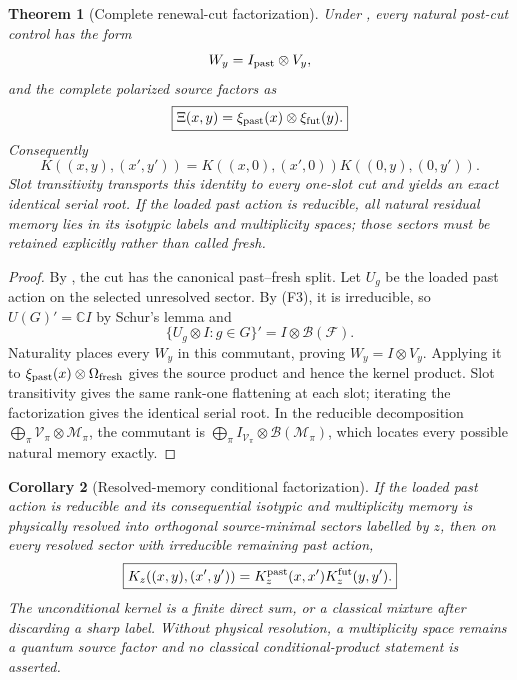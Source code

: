 \documentclass[11pt]{article}
\newtheorem{theorem}{Theorem}[section]
\newtheorem{corollary}[theorem]{Corollary}
\theoremstyle{definition}
\theoremstyle{remark}
\newcommand{\C}{\mathbb C}
\begin{document}
\begin{theorem}[Complete renewal-cut factorization]
\label{thm:complete-cut-factorization-master}
Under , every natural post-cut control has the
form
\[
 W_y=I_{\rm past}\otimes V_y,
\]
and the complete polarized source factors as
\[
 \boxed{\Xi(x,y)=\xi_{\rm past}(x)\otimes\xi_{\rm fut}(y).}
\]
Consequently
\[
 \boxed{
 K((x,y),(x',y'))
 =K((x,0),(x',0))K((0,y),(0,y')).}
\]
Slot transitivity transports this identity to every one-slot cut and yields an
exact identical serial root.  If the loaded past action is reducible, all
natural residual memory lies in its isotypic labels and multiplicity spaces;
those sectors must be retained explicitly rather than called fresh.
\end{theorem}

\begin{proof}
By ,
the cut has the canonical past--fresh split.  Let $U_g$ be the loaded past
action on the selected unresolved sector.  By
\textup{(F3)}, it is irreducible, so
$U(G)'=\C I$ by Schur's lemma and
\[
 \{U_g\otimes I:g\in G\}'=I\otimes\mathcal B(\mathcal F).
\]
Naturality places every $W_y$ in this commutant, proving
$W_y=I\otimes V_y$.  Applying it to
$\xi_{\rm past}(x)\otimes\Omega_{\rm fresh}$ gives the source product and
hence the kernel product.  Slot transitivity gives the same rank-one
flattening at each slot; iterating the factorization gives the identical serial
root.  In the reducible decomposition
$\bigoplus_\pi\mathcal V_\pi\otimes\mathcal M_\pi$, the commutant is
$\bigoplus_\pi I_{\mathcal V_\pi}\otimes\mathcal B(\mathcal M_\pi)$, which
locates every possible natural memory exactly.
\end{proof}

\begin{corollary}[Resolved-memory conditional factorization]
\label{cor:resolved-memory-factorization-master}
If the loaded past action is reducible and its consequential isotypic and
multiplicity memory is physically resolved into orthogonal source-minimal
sectors labelled by $z$, then on every resolved sector with irreducible
remaining past action,
\begin{equation}
  \boxed{
  K_z((x,y),(x',y'))
  =K_z^{\rm past}(x,x')K_z^{\rm fut}(y,y').}
  \label{eq:resolved-memory-factorization-master}
\end{equation}
The unconditional kernel is a finite direct sum, or a classical mixture after
discarding a sharp label.  Without physical resolution, a multiplicity space
remains a quantum source factor and no classical conditional-product statement
is asserted.
\end{corollary}
\end{document}
